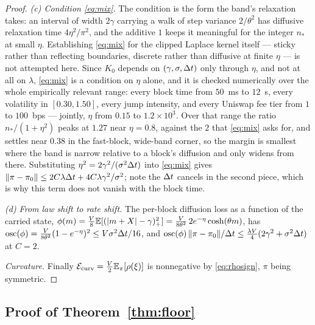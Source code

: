 \begin{proof}
\emph{(c) Condition \eqref{eq:mix}.} The condition is the form the band's relaxation takes: an interval of width $2\gamma$ carrying a walk of step variance $2/\theta^2$ has diffusive relaxation time $4\eta^2/\pi^2$, and the additive $1$ keeps it meaningful for the integer $n_*$ at small $\eta$. Establishing \eqref{eq:mix} for the clipped Laplace kernel itself --- sticky rather than reflecting boundaries, discrete rather than diffusive at finite $\eta$ --- is not attempted here. Since $K_0$ depends on $(\gamma,\sigma,\Delta t)$ only through $\eta$, and not at all on $\lambda$, \eqref{eq:mix} is a condition on $\eta$ alone, and it is checked numerically over the whole empirically relevant range: every block time from $50$~ms to $12$~s, every volatility in $[0.30,1.50]$, every jump intensity, and every Uniswap fee tier from $1$ to $100$~bps --- jointly, $\eta$ from $0.15$ to $1.2\times10^{3}$. Over that range the ratio $n_*/(1+\eta^2)$ peaks at $1.27$ near $\eta=0.8$, against the $2$ that \eqref{eq:mix} asks for, and settles near $0.38$ in the fast-block, wide-band corner, so the margin is smallest where the band is narrow relative to a block's diffusion and only widens from there. Substituting $\eta^2=2\gamma^2/(\sigma^2\Delta t)$ into \eqref{eq:mix} gives $\|\pi-\pi_0\|\le 2C\lambda\Delta t+4C\lambda\gamma^2/\sigma^2$; note the $\Delta t$ cancels in the second piece, which is why this term does not vanish with the block time.

\emph{(d) From law shift to rate shift.} The per-block diffusion loss as a function of the carried state, $\phi(m)=\tfrac{V}{8}\mathbb{E}[(|m+X|-\gamma)_+^2] = \tfrac{V}{8\theta^2}\,2e^{-\eta}\cosh(\theta m)$, has $\mathrm{osc}(\phi)=\tfrac{V}{8\theta^2}(1-e^{-\eta})^2\le V\sigma^2\Delta t/16$, and $\mathrm{osc}(\phi)\,\|\pi-\pi_0\|/\Delta t \le \tfrac{\lambda V}{4}(2\gamma^2+\sigma^2\Delta t)$ at $C=2$.

\emph{Curvature.} Finally $\mathcal{E}_{\mathrm{curv}} = \tfrac{V}{2}\mathbb{E}_\pi[\rho(\xi)]$ is nonnegative by \eqref{eq:rhosign}, $\pi$ being symmetric.
\end{proof}

\subsection{Proof of Theorem~\ref{thm:floor}}\label{app:floor}

